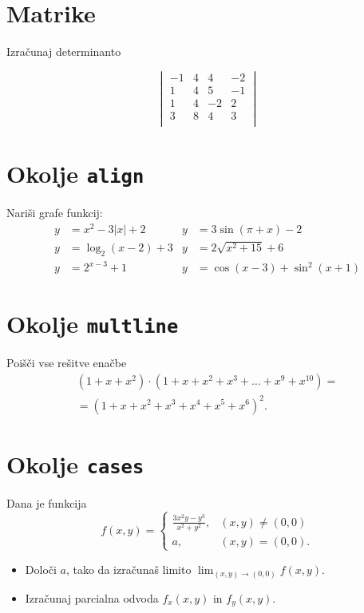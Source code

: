 \documentclass[a4paper,12pt]{article}
\begin{document}
\section*{Matrike}
Izračunaj determinanto
  
\[
\begin{vmatrix}
  
    -1 & 4 & 4 & -2 \\ 
   1 & 4 & 5 & -1 \\ 
   1 & 4 & -2 & 2 \\ 
   3 & 8 & 4 & 3 \\ 
\end{vmatrix}
\]
\section*{Okolje \texttt{align}}
Nariši grafe funkcij:
\begin{align*}
   y &= x^2 - 3|x| + 2    &y &= 3 \sin(\pi+x) - 2\\
   y &= \log_2(x-2) + 3   &y &= 2 \sqrt{x^2+15} + 6\\
   y &= 2^{x-3} + 1       &y &= \cos(x-3) + \sin^2(x+1)
\end{align*}



\section*{Okolje \texttt{multline}}
Poišči vse rešitve enačbe
\begin{multline*}
(1+x+x^2) \cdot (1+x+x^2+x^3+\ldots+x^9+x^{10}) =\\
=(1+x+x^2+x^3+x^4+x^5+x^6)^2.
\end{multline*}

\section*{Okolje \texttt{cases}}
Dana je funkcija
   \[
   f(x,y)=
   \begin{cases}
   \frac{3x^2y-y^3}{x^2+y^2}, & (x,y)\neq(0,0)\\
   a, & (x,y)=(0,0).
   \end{cases}
   \]
\begin{itemize}
\item Določi \(a\), tako da izračunaš limito \( \lim_{(x,y)\to(0,0)} f(x,y) \).
\item Izračunaj parcialna odvoda \(f_x(x,y)\) in \(f_y(x,y)\).
\end{itemize}
\end{document}

